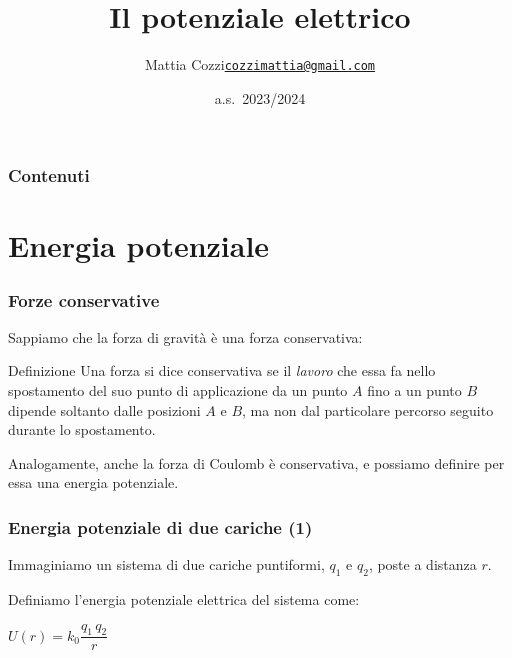 \documentclass[]{beamer}
\title{Il potenziale elettrico}
\author{\texorpdfstring{Mattia Cozzi\newline\href{mailto:cozzimattia@gmail.com}{\texttt{cozzimattia@gmail.com}}}{Mattia Cozzi}}
\date{a.s.~2023/2024}
\theoremstyle{plain}
\begin{document}
\begin{frame}
  \titlepage
\end{frame}





\begin{frame}
\frametitle{Contenuti}
\tableofcontents
\end{frame}


\section{Energia potenziale}

\begin{frame}
\frametitle{Forze conservative}
Sappiamo che la forza di gravità è una forza conservativa:
\begin{block}{Definizione}
Una forza si dice conservativa se il \emph{lavoro} che essa fa nello spostamento del suo punto di applicazione da un punto $ A $ fino a un punto $ B $ dipende soltanto dalle posizioni $ A $ e $ B $, ma non dal particolare percorso seguito durante lo spostamento.
\end{block}\pause
Analogamente, anche la forza di Coulomb è conservativa, e possiamo definire per essa una \alert{energia potenziale}.
\end{frame}


\begin{frame}
\frametitle{Energia potenziale di due cariche (1)}
Immaginiamo un sistema di due cariche puntiformi, $ q_1 $ e $ q_2 $, poste a distanza $ r $.
\begin{figure}
\end{figure}\pause
Definiamo l'energia potenziale elettrica del sistema come:
\begin{center}
\colorbox{blue!30}{$ U(r) = k_0 \dfrac{q_1 \, q_2}{r} $}
\end{center}
\end{frame}
\end{document}
